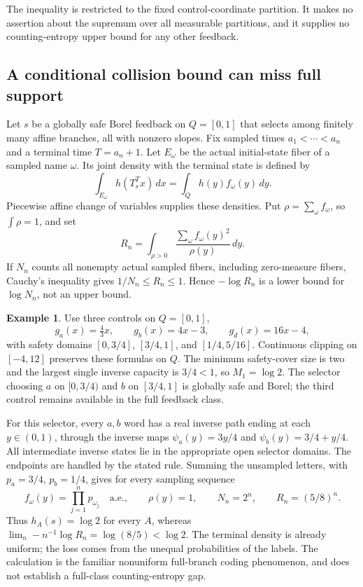 \documentclass[11pt,reqno]{amsart}
\numberwithin{equation}{section}
\theoremstyle{definition}
\newtheorem{example}[theorem]{Example}
\theoremstyle{definition}
\begin{document}
The inequality is restricted to the fixed control-coordinate
partition. It makes no assertion about the supremum over all
measurable partitions, and it supplies no counting-entropy upper
bound for any other feedback.

\subsection{A conditional collision bound can miss full support}

Let $s$ be a globally safe Borel feedback on $Q=[0,1]$ that selects
among finitely many affine branches, all with nonzero slopes. Fix
sampled times $a_1<\cdots<a_n$ and a terminal time $T=a_n+1$.
Let $E_\omega$ be the actual initial-state fiber of a sampled
name $\omega$. Its joint density with the terminal state is
defined by
\[
 \int_{E_\omega}h(T_s^Tx)\,dx
 =\int_Q h(y)f_\omega(y)\,dy.
\]
Piecewise affine change of variables supplies these densities.
Put $\rho=\sum_\omega f_\omega$, so $\int\rho=1$, and set
\[
 R_n=\int_{\rho>0}
       \frac{\sum_\omega f_\omega(y)^2}{\rho(y)}\,dy.
\]
If $N_n$ counts all nonempty actual sampled fibers, including
zero-measure fibers, Cauchy's inequality gives
$1/N_n\le R_n\le1$. Hence $-\log R_n$ is a lower bound for
$\log N_n$, not an upper bound.

\begin{example}\label{ex:collision-boundary}
Use three controls on $Q=[0,1]$,
\[
 g_a(x)=\tfrac43x,\qquad g_b(x)=4x-3,\qquad g_d(x)=16x-4,
\]
with safety domains $[0,3/4]$, $[3/4,1]$, and $[1/4,5/16]$.
Continuous clipping on $[-4,12]$ preserves these formulas on
$Q$. The minimum safety-cover size is two and the largest
single inverse capacity is $3/4<1$, so $M_1=\log2$.
The selector choosing $a$ on $[0,3/4)$ and $b$ on $[3/4,1]$
is globally safe and Borel; the third control remains available
in the full feedback class.

For this selector, every $a,b$ word has a real inverse path
ending at each $y\in(0,1)$, through the inverse maps
$\psi_a(y)=3y/4$ and $\psi_b(y)=3/4+y/4$.
All intermediate inverse states lie in the appropriate open
selector domains. The endpoints are handled by the stated rule.
Summing the unsampled letters, with $p_a=3/4$, $p_b=1/4$,
gives for every sampling sequence
\[
 f_\omega(y)=\prod_{j=1}^np_{\omega_j}\quad\text{a.e.},\qquad
 \rho(y)=1,\qquad N_n=2^n,\qquad R_n=(5/8)^n.
\]
Thus $h_A(s)=\log2$ for every $A$, whereas
$\lim_n-n^{-1}\log R_n=\log(8/5)<\log2$.
The terminal density is already uniform; the loss comes from
the unequal probabilities of the labels. The calculation is
the familiar nonuniform full-branch coding phenomenon, and
does not establish a full-class counting-entropy gap.
\end{example}
\end{document}
